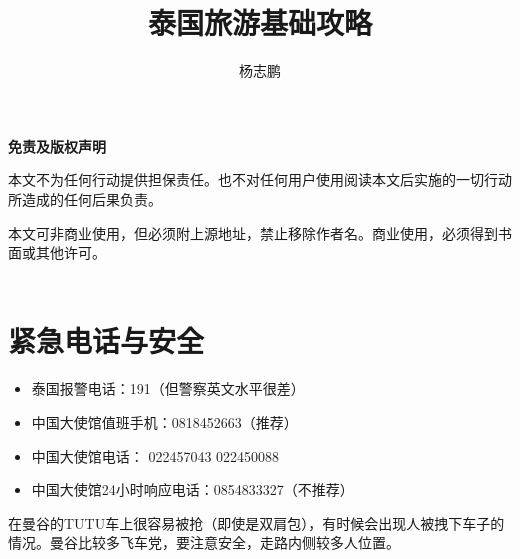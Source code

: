 \documentclass[utf-8,10pt]{ctexart}
\title{\textbf{泰国旅游基础攻略}}
\author{杨志鹏}
\begin{document}
\setcounter{page}{0}
\maketitle
\thispagestyle{empty}
\newpage
\pagestyle{fancy}
\tableofcontents
\paragraph{}
\noindent{}
\paragraph{}
\textbf{免责及版权声明}

本文不为任何行动提供担保责任。也不对任何用户使用阅读本文后实施的一切行动所造成的任何后果负责。

本文可非商业使用，但必须附上源地址，禁止移除作者名。商业使用，必须得到书面或其他许可。\\\\
\section{紧急电话与安全}
\begin{itemize}
\item 泰国报警电话：191（但警察英文水平很差）
\item 中国大使馆值班手机：0818452663（推荐）
\item 中国大使馆电话： 022457043 022450088
\item 中国大使馆24小时响应电话：0854833327（不推荐）
\end{itemize}

在曼谷的TUTU车上很容易被抢（即使是双肩包），有时候会出现人被拽下车子的情况。曼谷比较多飞车党，要注意安全，走路内侧较多人位置。
\end{document}
